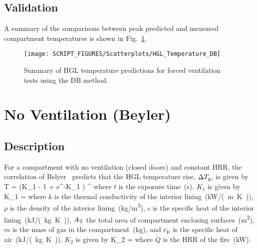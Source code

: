 \clearpage


\subsection*{Validation}

A summary of the comparisons between peak predicted and measured compartment temperatures is shown in Fig.~\ref{HGL_Summary_Forced_Ventilation_DB}.

\begin{figure}[!ht]
\begin{center}
\texttt{[image: SCRIPT\_FIGURES/Scatterplots/HGL\_Temperature\_DB]}
\end{center}
\caption[Summary of HGL temperature predictions for forced ventilation tests (DB)]
{Summary of HGL temperature predictions for forced ventilation tests using the DB method.}
\label{HGL_Summary_Forced_Ventilation_DB}
\end{figure}


\clearpage


\section{No Ventilation (Beyler)}

\subsection*{Description}

For a compartment with no ventilation (closed doors) and constant HRR, the correlation of Belyer~\cite{SFPE:Walton} predicts that the HGL temperature rise, $\Delta T\sb{g}$, is given by
\be
\Delta T =  (K_1  - 1 + e^{-K_1 }) \quad ^
\label{eq:Beyler}
\ee
where $t$ is the exposure time~(\si{\second}). $K_1$ is given by
\be
K_1 = 
\label{eq:Beyler_K1}
\ee
where $k$ is the thermal conductivity of the interior lining~(\si{kW/(m.K)}), $\rho$ is the density of the interior lining~(\si{kg/m^3}), $c$ is the specific heat of the interior lining~(\si{kJ/(kg.K)}), $A\sb{T}$ the total area of compartment enclosing surfaces~(\si{m^2}), $m$ is the mass of gas in the compartment~(\si{kg}), and $c\sb{p}$ is the specific heat of air~(\si{kJ/(kg.K)}). $K_2$ is given by
\be
K_2 = 
\label{eq:Beyler_K2}
\ee
where $\dot Q$ is the HRR of the fire~(\si{kW}).


\clearpage


